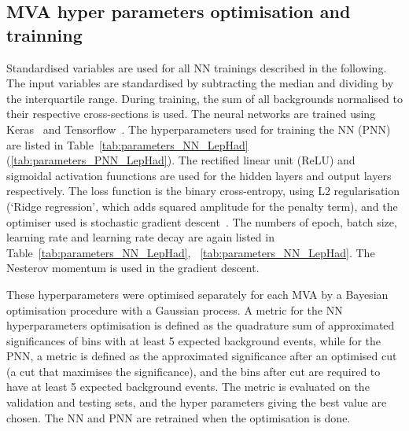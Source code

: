 \subsection{MVA hyper parameters optimisation and trainning}
Standardised variables are used for all NN trainings described in the following.
The input variables are standardised by subtracting the median and dividing by the
interquartile range.
During training, the sum of all backgrounds normalised to
their respective cross-sections is used. 
The neural networks are trained using
Keras~\cite{keras} and Tensorflow~\cite{tensorflow}.
The hyperparameters used for training the NN (PNN) are 
listed in Table~\ref{tab:parameters_NN_LepHad} (\ref{tab:parameters_PNN_LepHad}).
The rectified linear unit (ReLU) and sigmoidal activation fuunctions 
are used for the hidden layers and output layers respectively.
The loss function is the binary cross-entropy, 
using L2 regularisation (`Ridge regression', which adds squared amplitude 
for the penalty term), and the optimiser used 
is stochastic gradient descent~\cite{Goodfellow-et-al-2016}.
The numbers of epoch, batch size, learning rate and 
learning rate decay are again listed in Table~\ref{tab:parameters_NN_LepHad},
~\ref{tab:parameters_NN_LepHad}. 
The Nesterov momentum is used in the gradient descent. 

These hyperparameters were optimised 
separately for each MVA by a Bayesian optimisation procedure with 
a Gaussian process. 
A metric for the NN hyperparameters optimisation is defined 
as the quadrature sum of approximated significances
of bins with at least 5 expected background events,
while for the PNN, a metric is defined as the approximated
significance after an optimised cut (a cut that maximises the 
significance), and the bins after cut are required to have 
at least 5 expected background events. 
The metric is evaluated on the validation and testing sets,
and the hyper parameters giving the best value are chosen. 
The NN and PNN are retrained when the optimisation is done. 

